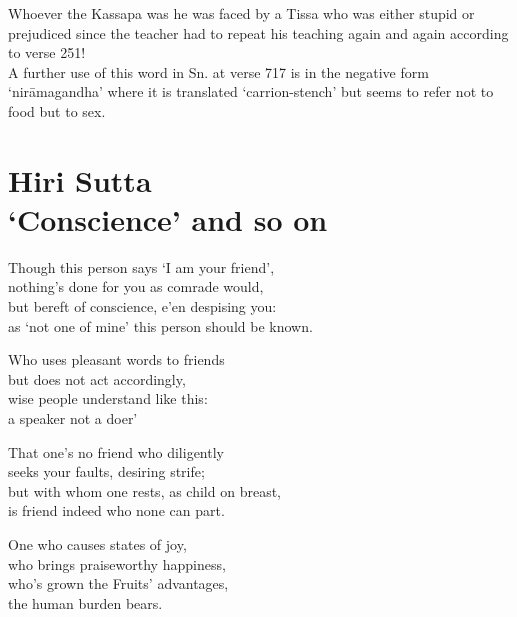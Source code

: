 Whoever the Kassapa was he was faced by a Tissa who was either stupid or prejudiced since the teacher had to repeat his teaching again and again according to verse 251!\\

A further use of this word in Sn. at verse 717 is in the negative form `nir\=amagandha' where it is translated `carrion-stench' but seems to refer not to food but to sex.

\chapter{Hiri Sutta\\ `Conscience' and so on}

\begin{MyDescription}{}
Though this person says `I am your friend',\\
nothing's done for you as comrade would,\\
but bereft of conscience, e'en despising you:\\
as `not one of mine' this person should be known.
\end{MyDescription}

\begin{MyDescription}{}
Who uses pleasant words to friends\\
but does not act accordingly,\\
wise people understand like this:\\
a speaker not a doer'
\end{MyDescription}

\begin{MyDescription}{}
That one's no friend who diligently\\
seeks your faults, desiring strife;\\
but with whom one rests, as child on breast,\\
is friend indeed who none can part.
\end{MyDescription}

\begin{MyDescription}{}
One who causes states of joy,\\
who brings praiseworthy happiness,\\
who's grown the Fruits' advantages,\\
the human burden bears.
\end{MyDescription}

